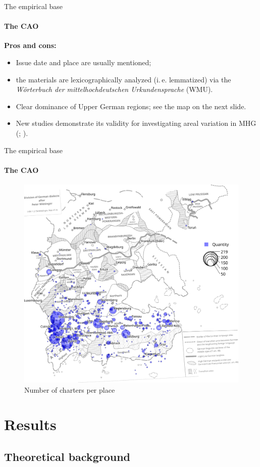 \documentclass[xcolor=table, compress, %
handout
]{beamer}
\begin{document}
\begin{frame}{The empirical base}
\framesubtitle{The CAO}

\textbf{Pros and cons:}

\begin{itemize}
\item Issue date and place are usually mentioned;
\item the materials are lexicographically analyzed (i.\,e. lemmatized) via the \textit{Wörterbuch der mittelhochdeutschen Urkundensprache} (WMU).
\item Clear dominance of Upper German regions; see the map on the next slide. 
\end{itemize}

{\small
\begin{itemize}
\item[\Pointinghand] New studies demonstrate its validity for investigating areal variation in MHG (\citealt{beckerschallert21,beckerschallert22a,beckerschallert22b}; \citealt{HertelimErscheinen}).
\end{itemize}
}

\end{frame}


\begin{frame}{The empirical base}
\framesubtitle{The CAO}

	\begin{figure}
		\includegraphics[width=.55\linewidth]{placeunique.png}
		\caption{Number of charters per place \citep[background map adapted
		from][]{wiesinger1983:rede}}
	\end{figure}
\end{frame}


\section{Results}
\subsection{Theoretical background}
\end{document}
